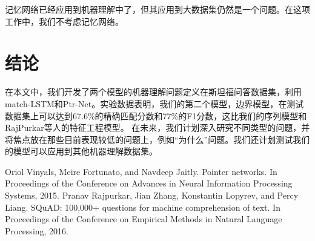 \documentclass{article}
\begin{document}
\begin{CJK*}{UTF8}{gbsn}
    记忆网络已经应用到机器理解中了，但其应用到大数据集仍然是一个问题。在这项工作中，我们不考虑记忆网络。


    \section{结论}
    在本文中，我们开发了两个模型的机器理解问题定义在斯坦福问答数据集，利用match-LSTM和Ptr-Net。实验数据表明，我们的第二个模型，边界模型，在测试数据集上可以达到67.6\%的精确匹配分数和77\%的F1分数，这比我们的序列模型和RajPurkar等人的特征工程模型。
    在未来，我们计划深入研究不同类型的问题，并将焦点放在那些目前表现较低的问题上，例如“为什么”问题。我们还计划测试我们的模型可以应用到其他机器理解数据集。

    \end{CJK*}
    \begin{thebibliography}{99}
         Oriol Vinyals, Meire Fortunato, and Navdeep Jaitly. Pointer networks. In Proceedings of the Conference on Advances in Neural Information Processing Systems, 2015.
        Pranav Rajpurkar, Jian Zhang, Konstantin Lopyrev, and Percy Liang. SQuAD: 100,000+ questions for machine comprehension of text. In Proceedings of the Conference on Empirical Methods in Natural Language Processing, 2016.
        
    \end{thebibliography}
    
\end{document}

